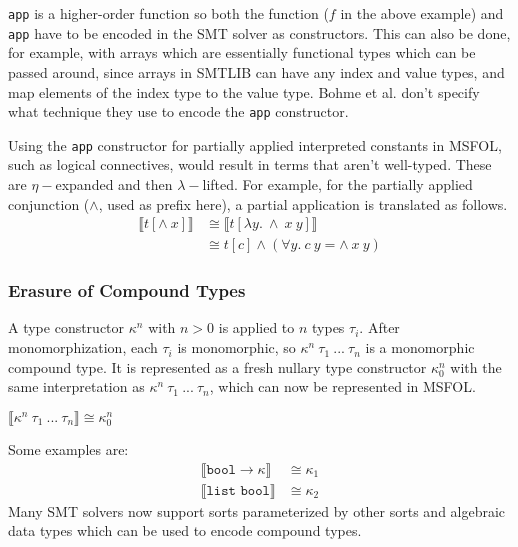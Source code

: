 \documentclass{article}
\begin{document}
		\texttt{app} is a higher-order 
		function so both the function 
		($f$ in the above example) and 
		\texttt{app} have to be encoded 
		in the SMT solver as constructors.
		This can also be done, for example, 
		with arrays which are essentially 
		functional types which can be passed
		around, since arrays in SMTLIB 
		can have any index and value types, 
		and map elements of the index type 
		to the value type. Bohme et al. 
		don't specify what technique 
		they use to encode the 
		\texttt{app} constructor.
		
		Using the \texttt{app} constructor
		for partially applied interpreted 
		constants in MSFOL, such as 
		logical connectives, would result 
		in terms that aren't well-typed.
		These are $\eta-$expanded and 
		then $\lambda-$lifted. For example, 
		for the partially applied 
		conjunction ($\land$, used as prefix 
		here), a partial application is 
		translated as follows.
		\begin{align*}
			\llbracket t [\land\ x] 
			\rrbracket &\cong \llbracket 
			 t[\lambda y.\ \land\ x\ y]
			\rrbracket\\
			&\cong t[c]  \land (\forall y.\ 
			c\ y = \land\ x\ y)
		\end{align*}
		
	\subsubsection{Erasure of Compound Types}
		A type constructor $\kappa^n$ with 
		$n > 0$ is applied to $n$ types 
		$\tau_i$. After monomorphization, 
		each $\tau_i$ is monomorphic, so 
		$\kappa^n\ \tau_1\ ...\ \tau_n$ 
		is a monomorphic compound type. It
		is represented as a fresh nullary 
		type constructor $\kappa_0^n$ with 
		the same interpretation as 
		$\kappa^n\ \tau_1\ ...\ \tau_n$, 
		which can now be represented in 
		MSFOL.
		\begin{center}
			$\llbracket \kappa^n\ 
			\tau_1\ ...\ \tau_n \rrbracket
			\cong \kappa_0^n$
		\end{center}
		Some examples are:
		\begin{align*}
			\llbracket \texttt{bool} \to
			\kappa \rrbracket &\cong \kappa_1\\
			\llbracket \texttt{list\ bool}
			\rrbracket &\cong \kappa_2
		\end{align*}
		Many SMT solvers now support sorts 
		parameterized by other sorts and 
		algebraic data types which can be 
		used to encode compound types.
		
\end{document}
